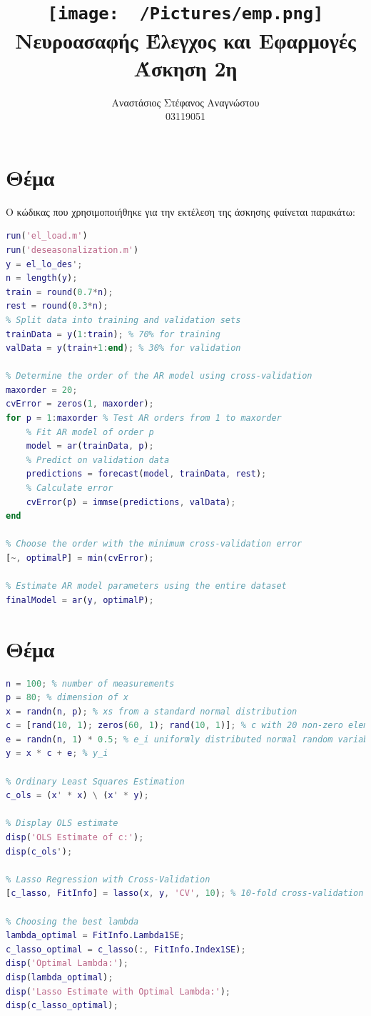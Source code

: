 \documentclass{article}
\title{
    \texttt{[image: ~/Pictures/emp.png]} \\
    \vskip 5cm
    Νευροασαφής Έλεγχος και Εφαρμογές\\
    \large Άσκηση 2η
    \vskip 5cm
}
\author{Αναστάσιος Στέφανος Αναγνώστου\\
        03119051}
\begin{document}
\maketitle
\newpage
\tableofcontents
\newpage

\section{Θέμα}

Ο κώδικας που χρησιμοποιήθηκε για την εκτέλεση της άσκησης φαίνεται παρακάτω:

\begin{lstlisting}[language=Matlab]
% Load data
run('el_load.m')
run('deseasonalization.m')
y = el_lo_des';
n = length(y);
train = round(0.7*n);
rest = round(0.3*n);
% Split data into training and validation sets
trainData = y(1:train); % 70% for training
valData = y(train+1:end); % 30% for validation

% Determine the order of the AR model using cross-validation
maxorder = 20;
cvError = zeros(1, maxorder);
for p = 1:maxorder % Test AR orders from 1 to maxorder
    % Fit AR model of order p
    model = ar(trainData, p);
    % Predict on validation data
    predictions = forecast(model, trainData, rest);
    % Calculate error
    cvError(p) = immse(predictions, valData);
end

% Choose the order with the minimum cross-validation error
[~, optimalP] = min(cvError);

% Estimate AR model parameters using the entire dataset
finalModel = ar(y, optimalP);
\end{lstlisting}

\clearpage
\section{Θέμα}

\begin{lstlisting}[language=Matlab]
% Generate the data
n = 100; % number of measurements
p = 80; % dimension of x
x = randn(n, p); % xs from a standard normal distribution
c = [rand(10, 1); zeros(60, 1); rand(10, 1)]; % c with 20 non-zero elements
e = randn(n, 1) * 0.5; % e_i uniformly distributed normal random variables
y = x * c + e; % y_i

% Ordinary Least Squares Estimation
c_ols = (x' * x) \ (x' * y);

% Display OLS estimate
disp('OLS Estimate of c:');
disp(c_ols');

% Lasso Regression with Cross-Validation
[c_lasso, FitInfo] = lasso(x, y, 'CV', 10); % 10-fold cross-validation

% Choosing the best lambda
lambda_optimal = FitInfo.Lambda1SE;
c_lasso_optimal = c_lasso(:, FitInfo.Index1SE);
disp('Optimal Lambda:');
disp(lambda_optimal);
disp('Lasso Estimate with Optimal Lambda:');
disp(c_lasso_optimal);
\end{lstlisting}
\end{document}
